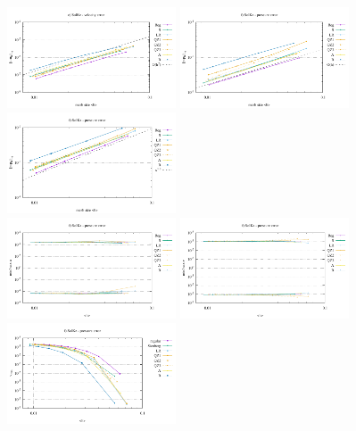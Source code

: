\begin{center}
\includegraphics[width=5cm]{python_codes/fieldstone_78/results/mms_solkz/errors_V}
\includegraphics[width=5cm]{python_codes/fieldstone_78/results/mms_solkz/errors_P}
\includegraphics[width=5cm]{python_codes/fieldstone_78/results/mms_solkz/errors_Q}\\
\includegraphics[width=5cm]{python_codes/fieldstone_78/results/mms_solkz/ustats}
\includegraphics[width=5cm]{python_codes/fieldstone_78/results/mms_solkz/vstats}
\includegraphics[width=5cm]{python_codes/fieldstone_78/results/mms_solkz/vrms.pdf}\\

\end{center}

